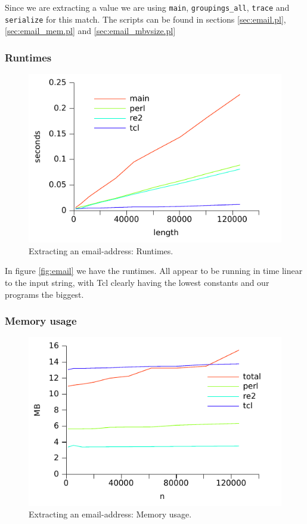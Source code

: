 Since we are extracting a value we are using \texttt{main},
\texttt{groupings\_all}, \texttt{trace} and \texttt{serialize} for
this match. The scripts can be found in sections \vref{sec:email.pl},
\vref{sec:email_mem.pl} and \vref{sec:email_mbvsize.pl}

\subsubsection{Runtimes}

\begin{figure}
\centering
\includegraphics{benchmarks/email.pdf}
\caption{Extracting an email-address: Runtimes.}
\label{fig:email}
\end{figure}

In figure \vref{fig:email} we have the runtimes. All appear to be
running in time linear to the input string, with Tcl clearly having
the lowest constants and our programs the biggest. 


\subsubsection{Memory usage}


\begin{figure}
\centering
\includegraphics{benchmarks/memory/email_mem.pdf}
\caption{Extracting an email-address: Memory usage.}
\label{fig:email_mem}
\end{figure}

